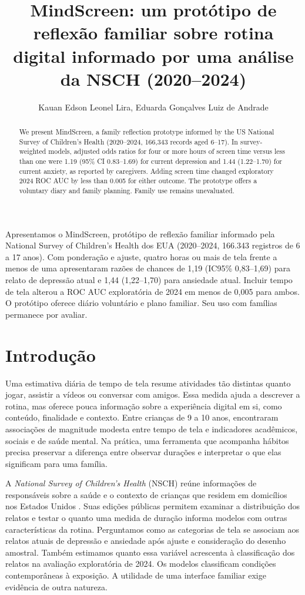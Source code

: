 ﻿\documentclass[12pt]{article}
\title{MindScreen: um protótipo de reflexão familiar sobre rotina digital informado por uma análise da NSCH (2020--2024)}
\author{Kauan Edson Leonel Lira\inst{1}, Eduarda Gonçalves Luiz de Andrade\inst{1}}
\begin{document}
\maketitle
\begin{abstract}
We present MindScreen, a family reflection prototype informed by the US National Survey of Children's Health (2020--2024, 166,343 records aged 6--17). In survey-weighted models, adjusted odds ratios for four or more hours of screen time versus less than one were 1.19 (95\% CI 0.83--1.69) for current depression and 1.44 (1.22--1.70) for current anxiety, as reported by caregivers. Adding screen time changed exploratory 2024 ROC AUC by less than 0.005 for either outcome. The prototype offers a voluntary diary and family planning. Family use remains unevaluated.
\end{abstract}
\begin{resumo}
Apresentamos o MindScreen, protótipo de reflexão familiar informado pela National Survey of Children's Health dos EUA (2020--2024, 166.343 registros de 6 a 17 anos). Com ponderação e ajuste, quatro horas ou mais de tela frente a menos de uma apresentaram razões de chances de 1,19 (IC95\% 0,83--1,69) para relato de depressão atual e 1,44 (1,22--1,70) para ansiedade atual. Incluir tempo de tela alterou a ROC AUC exploratória de 2024 em menos de 0,005 para ambos. O protótipo oferece diário voluntário e plano familiar. Seu uso com famílias permanece por avaliar.
\end{resumo}

\section{Introdução}
Uma estimativa diária de tempo de tela resume atividades tão distintas quanto jogar, assistir a vídeos ou conversar com amigos. Essa medida ajuda a descrever a rotina, mas oferece pouca informação sobre a experiência digital em si, como conteúdo, finalidade e contexto. Entre crianças de 9 a 10 anos, \cite{paulich2021} encontraram associações de magnitude modesta entre tempo de tela e indicadores acadêmicos, sociais e de saúde mental. Na prática, uma ferramenta que acompanha hábitos precisa preservar a diferença entre observar durações e interpretar o que elas significam para uma família.

A \textit{National Survey of Children's Health} (NSCH) reúne informações de responsáveis sobre a saúde e o contexto de crianças que residem em domicílios nos Estados Unidos \cite{censusdata,censusguide}. Suas edições públicas permitem examinar a distribuição dos relatos e testar o quanto uma medida de duração informa modelos com outras características da rotina. Perguntamos como as categorias de tela se associam aos relatos atuais de depressão e ansiedade após ajuste e consideração do desenho amostral. Também estimamos quanto essa variável acrescenta à classificação dos relatos na avaliação exploratória de 2024. Os modelos classificam condições contemporâneas à exposição. A utilidade de uma interface familiar exige evidência de outra natureza.
\end{document}

